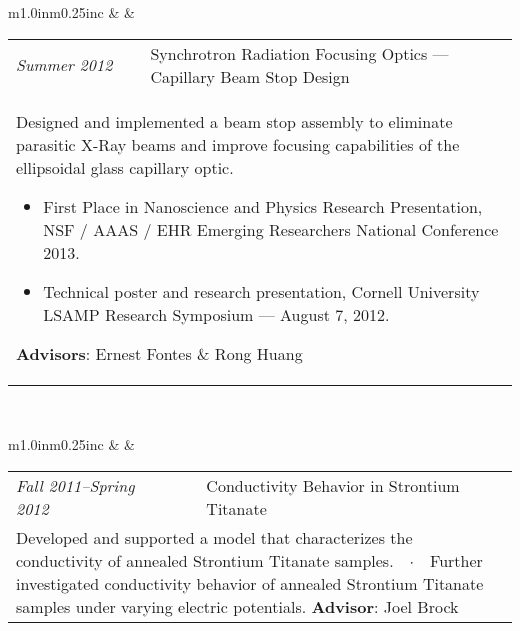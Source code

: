 \documentclass[11pt]{article}
\begin{document}
\begin{center}
\begin{tabular}{m{1.0in}m{0.25in}c}
 & & 
\begin{tabular}{m{0.85in}m{0.15in}m{3.75in}}
\textit{\small{Summer 2012}} & & Synchrotron Radiation Focusing Optics --- Capillary Beam Stop Design \\ \multicolumn{3}{p{4.75in}}{\footnotesize{Designed and implemented a beam stop assembly to eliminate parasitic X-Ray beams and improve focusing capabilities of the ellipsoidal glass capillary optic. \noindent\begin{itemize}[leftmargin=*] \item \textcolor{NavyBlue}{First Place in Nanoscience and Physics Research Presentation}, NSF / AAAS / EHR Emerging Researchers National Conference 2013. \item Technical poster and research presentation, Cornell University LSAMP Research Symposium --- August 7, 2012. \end{itemize} \textbf{Advisors}: Ernest Fontes \& Rong Huang}} 
\end{tabular} \\ 
\end{tabular}
\end{center}

\begin{center}
\begin{tabular}{m{1.0in}m{0.25in}c}
 & & 
\begin{tabular}{m{0.85in}m{0.15in}m{3.75in}}
\textit{\small{Fall 2011--Spring 2012}} & & Conductivity Behavior in Strontium Titanate \\ \multicolumn{3}{p{4.75in}}{\footnotesize{Developed and supported a model that characterizes the conductivity of annealed Strontium Titanate samples.\ \ $\cdotp$\ \ Further investigated conductivity behavior of annealed Strontium Titanate samples under varying electric potentials. \newline \textbf{Advisor}: Joel Brock}} 
\end{tabular} \\ 
\end{tabular}
\end{center}
\end{document}

